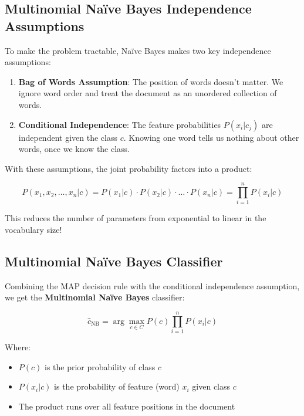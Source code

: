 \documentclass[11pt,a4paper]{article}
\theoremstyle{definition}
\theoremstyle{plain}
\theoremstyle{remark}
\begin{document}
\subsection{Multinomial Naïve Bayes Independence Assumptions}

To make the problem tractable, Naïve Bayes makes two key independence assumptions:

\begin{tcolorbox}[colback=orange!5!white,colframe=orange!75!black,title=\textbf{Naïve Bayes Independence Assumptions}]
\begin{enumerate}
    \item \textbf{Bag of Words Assumption}: The position of words doesn't matter. We ignore word order and treat the document as an unordered collection of words.
    
    \item \textbf{Conditional Independence}: The feature probabilities $P(x_i | c_j)$ are independent given the class $c$. Knowing one word tells us nothing about other words, once we know the class.
\end{enumerate}
\end{tcolorbox}

With these assumptions, the joint probability factors into a product:

\[
P(x_1, x_2, \ldots, x_n | c) = P(x_1|c) \cdot P(x_2|c) \cdot \ldots \cdot P(x_n|c) = \prod_{i=1}^{n} P(x_i|c)
\]

This reduces the number of parameters from exponential to linear in the vocabulary size!

\subsection{Multinomial Naïve Bayes Classifier}

Combining the MAP decision rule with the conditional independence assumption, we get the \textbf{Multinomial Naïve Bayes} classifier:

\[
\hat{c}_{\text{NB}} = \arg\max_{c \in C} P(c) \prod_{i=1}^{n} P(x_i | c)
\]

Where:
\begin{itemize}
    \item $P(c)$ is the prior probability of class $c$
    \item $P(x_i | c)$ is the probability of feature (word) $x_i$ given class $c$
    \item The product runs over all feature positions in the document
\end{itemize}
\end{document}
